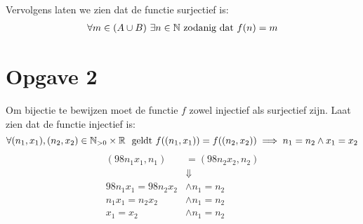 \documentclass{article}
\begin{document}
Vervolgens laten we zien dat de functie surjectief is:
\begin{align*}
    \forall m \in (A \cup B) \ \exists n \in \mathbb{N} \text{ zodanig dat } f(n) = m
\end{align*}



\section*{Opgave 2}
Om bijectie te bewijzen moet de functie $f$ zowel injectief als surjectief zijn.
Laat zien dat de functie injectief is:
\[\forall (n_1, x_1), (n_2, x_2) \in \mathbb{N}_{>0} \times \mathbb{R}\ \text{ geldt } f((n_1, x_1)) = f((n_2,x_2)) \implies n_1 = n_2 \wedge x_1 = x_2\]  
\begin{align*}
    (98n_1x_1, n_1) &= (98n_2x_2, n_2) \\
    &\Downarrow \\
    98n_1x_1 = 98n_2x_2 &\wedge n_1 = n_2 \\
    n_1x_1 = n_2x_2 &\wedge n_1 = n_2 \\
    x_1 = x_2 &\wedge n_1 = n_2 
\end{align*}
\end{document}
